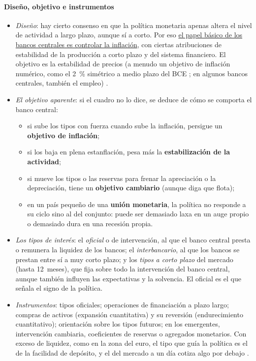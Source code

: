 \documentclass[11pt]{article}
\begin{document}
\paragraph{Diseño, objetivo e instrumentos}
\begin{itemize}
\item \emph{Diseño}: hay cierto consenso en que la política monetaria apenas altera el nivel de actividad a largo plazo, aunque sí a corto. Por eso \uline{el papel básico de los bancos centrales es controlar la inflación}, con ciertas atribuciones de estabilidad de la producción a corto plazo y del sistema financiero. El objetivo es la estabilidad de precios (a menudo un objetivo de inflación numérico, como el 2~\% simétrico a medio plazo del BCE \parencite{BCE2025Estrategia}; en algunos bancos centrales, también el empleo) .
\item \emph{El objetivo aparente}: si el cuadro no lo dice, se deduce de cómo se comporta el banco central:
  \begin{itemize}
  \item si sube los tipos con fuerza cuando sube la inflación, persigue un \textbf{objetivo de inflación};
  \item si los baja en plena estanflación, pesa más la \textbf{estabilización de la actividad};
  \item si mueve los tipos o las reservas para frenar la apreciación o la depreciación, tiene un \textbf{objetivo cambiario} (aunque diga que flota);
  \item en un país pequeño de una \textbf{unión monetaria}, la política no responde a su ciclo sino al del conjunto: puede ser demasiado laxa en un auge propio o demasiado dura en una recesión propia.
  \end{itemize}
\item \emph{Los tipos de interés}: el \emph{oficial} o de intervención, al que el banco central presta o remunera la liquidez de los bancos; el \emph{interbancario}, al que los bancos se prestan entre sí a muy corto plazo; y los \emph{tipos a corto plazo} del mercado (hasta 12~meses), que fija sobre todo la intervención del banco central, aunque también influyen las expectativas y la solvencia. El oficial es el que señala el signo de la política.
\item \emph{Instrumentos}: tipos oficiales; operaciones de financiación a plazo largo; compras de activos (expansión cuantitativa) y su reversión (endurecimiento cuantitativo); orientación sobre los tipos futuros; en los emergentes, intervención cambiaria, coeficientes de reservas o agregados monetarios. Con exceso de liquidez, como en la zona del euro, el tipo que guía la política es el de la facilidad de depósito, y el del mercado a un día cotiza algo por debajo \parencite{BCE2024Marco}.
\end{itemize}
\end{document}
